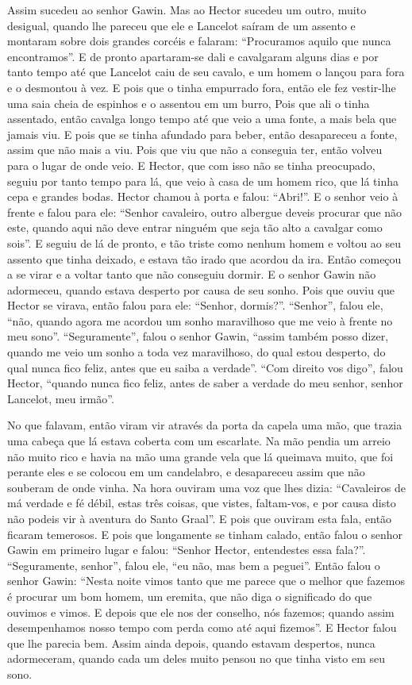 Assim sucedeu ao senhor Gawin. Mas ao Hector sucedeu um outro, muito desigual,
quando lhe pareceu que ele e Lancelot saíram de um assento e montaram sobre
dois grandes corcéis e falaram: “Procuramos aquilo que nunca encontramos”. E de
pronto apartaram-se dali e cavalgaram alguns dias e por tanto tempo até que
Lancelot caiu de seu cavalo, e um homem o lançou para fora e o desmontou à
vez. E pois que o tinha empurrado fora, então ele fez vestir-lhe uma saia cheia
de espinhos e o assentou em um burro, Pois que ali o tinha assentado, então
cavalga longo tempo até que veio a uma fonte, a mais bela que jamais viu. E
pois que se tinha afundado para beber, então desapareceu a fonte, assim que não
mais a viu. Pois que viu que não a conseguia ter, então volveu para o lugar de
onde veio. E Hector, que com isso não se tinha preocupado, seguiu por tanto
tempo para lá, que veio à casa de um homem rico, que lá tinha cepa e grandes
bodas. Hector chamou à porta e falou: “Abri!”. E o senhor veio à frente e falou
para ele: “Senhor cavaleiro, outro albergue deveis procurar que não este,
quando aqui não deve entrar ninguém que seja tão alto a cavalgar como sois”. E
seguiu de lá de pronto, e tão triste como nenhum homem e voltou ao seu assento
que tinha deixado, e estava tão irado que acordou da ira. Então
começou a se virar e a voltar tanto que não conseguiu dormir. E o senhor Gawin
não adormeceu, quando estava desperto por causa de seu sonho. Pois que ouviu
que Hector se virava, então falou para ele: “Senhor, dormis?”. “Senhor”, falou
ele, “não, quando agora me acordou um sonho maravilhoso que me veio à frente no
meu sono”. “Seguramente”, falou o senhor Gawin, “assim também posso dizer,
quando me veio um sonho a toda vez maravilhoso, do qual estou desperto, do qual
nunca fico feliz, antes que eu saiba a verdade”. “Com direito vos digo”, falou
Hector, “quando nunca fico feliz, antes de saber a verdade do meu senhor,
senhor Lancelot, meu irmão”.

No que falavam, então viram vir através da porta da capela uma mão, que trazia
uma cabeça que lá estava coberta com um escarlate. Na mão pendia um arreio não
muito rico e havia na mão uma grande vela que lá queimava muito, que foi
perante eles e se colocou em um candelabro, e desapareceu assim que não
souberam de onde vinha. Na hora ouviram uma voz que lhes dizia: “Cavaleiros de
má verdade e fé débil, estas três coisas, que vistes, faltam-vos, e por causa
disto não podeis vir à aventura do Santo Graal”. E pois que ouviram
esta fala, então ficaram temerosos. E pois que longamente se tinham calado,
então falou o senhor Gawin em primeiro lugar e falou: “Senhor Hector,
entendestes essa fala?”. “Seguramente, senhor”, falou ele, “eu não, mas bem a
peguei”. Então falou o senhor Gawin: “Nesta noite vimos tanto que me parece que
o melhor que fazemos é procurar um bom homem, um eremita, que não diga o
significado do que ouvimos e vimos. E depois que ele nos der conselho, nós
fazemos; quando assim desempenhamos nosso tempo com perda como até aqui
fizemos”. E Hector falou que lhe parecia bem. Assim ainda depois, quando
estavam despertos, nunca adormeceram, quando cada um deles muito pensou no que
tinha visto em seu sono.

